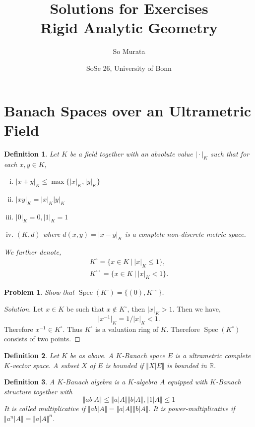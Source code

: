 \documentclass[8pt]{article}
\title{Solutions for Exercises \\ Rigid Analytic Geometry}
\author{So Murata}
\date{SoSe 26, University of Bonn}
\numberwithin{equation}{section}
\newenvironment{solution}{\begin{proof}[Solution]}{\end{proof}}
\newtheorem{definition}{Definition}[section]
\newtheorem{problem}{Problem}[section]
\DeclareMathOperator{\Spec}{Spec}
\newcommand{\norm}[1]{\Vert #1 \Vert}
\newcommand{\R}[0]{\mathbb{R}}
\newcommand{\sep}[0]{\:|\:}
\newcommand{\ab}[1]{\vert #1 \vert}
\newcommand{\dcirc}[0]{{\circ\circ}}
\begin{document}
\maketitle
\section{Banach Spaces over an Ultrametric Field}
\begin{definition}
  Let $K$ be a field together with an absolute value $\ab{\cdot}_K$ such that for each $x,y\in K$,
  \begin{enumerate}[i.]
    \item $\ab{x+y}_K\leq\max\{\ab{x}_K,\ab{y}_K\}$
    \item $\ab{xy}_K = \ab{x}_K\ab{y}_K$
    \item $\ab{0}_K = 0,\ab{1}_K = 1$
    \item $(K,d)$ where $d(x,y) = \ab{x-y}_K$ is a complete non-discrete metric space.
  \end{enumerate}
  We further denote,
  \begin{align*}
    K^\circ = \{x\in K\sep \ab{x}_K\leq 1\},\\
    K^\dcirc = \{x\in K\sep \ab{x}_K<1\}.
  \end{align*}
\end{definition}
\begin{problem}
Show that $\Spec(K^\circ) = \{(0),K^\dcirc\}$. 
\end{problem}
\begin{solution}
Let $x\in K$ be such that $x\not\in K^\circ$, then $\ab{x}_K>1$. Then we have,
\begin{equation*}
  \ab{x^{-1}}_K = 1/\ab{x}_K <1.
\end{equation*}
Therefore $x^{-1}\in K^\circ$. Thus $K^\circ$ is a valuation ring of $K$. Therefore $\Spec(K^\circ)$ consists of two points.
\end{solution}
\begin{definition}
  Let $K$ be as above. A $K$-Banach space $E$ is a ultrametric complete $K$-vector space. A subset $X$ of $E$ is bounded if $\norm{X|E}$ is bounded in $\R$.
\end{definition}
\begin{definition}
  A $K$-Banach algebra is a $K$-algebra $A$ equipped with $K$-Banach structure together with 
  \begin{equation*}
    \norm{ab|A}\leq\norm{a|A}\norm{b|A},\norm{1|A} \leq 1
  \end{equation*}
  It is called multiplicative if $\norm{ab|A} = \norm{a|A}\norm{b|A}$. It is power-multiplicative if $\norm{a^n|A} = \norm{a|A}^n$.
\end{definition}
\end{document}
